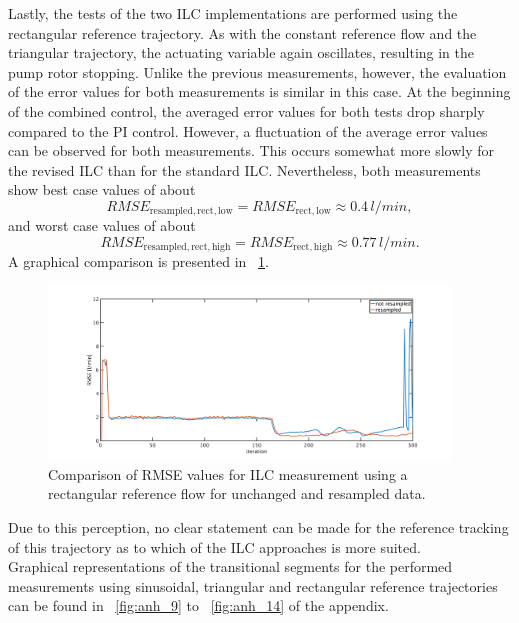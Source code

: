 Lastly, the tests of the two ILC implementations are performed using the rectangular reference trajectory.  As with the constant reference flow and the triangular trajectory, the actuating variable again oscillates, resulting in the pump rotor stopping.
Unlike the previous measurements, however, the evaluation of the error values for both measurements is similar in this case. At the beginning of the combined control, the averaged error values for both tests drop sharply compared to the PI control. However, a fluctuation of the average error values can be observed for both measurements. This occurs somewhat more slowly for the revised ILC than for the standard ILC. Nevertheless, both measurements show best case values of about
\begin{equation}
  RMSE_{\mathrm{resampled,rect,low}}=RMSE_{\mathrm{rect,low}}\approx0.4\,l/min,
\end{equation}
and worst case values of about
\begin{equation}
  RMSE_{\mathrm{resampled,rect,high}}=RMSE_{\mathrm{rect,high}}\approx0.77\,l/min.
\end{equation}
A graphical comparison is presented in \figurename~\ref{fig:RMSE_ilc_var_dist_comp_rect}.
\begin{figure}[ht!]
  \centering
  \includegraphics[width=0.95\textwidth]{images/chapt_5/ILC/RMSE_ilc_var_dist_comp_rect.pdf}
  \caption[Comparison of RMSE values for ILC measurement using a rectangular reference flow for unchanged and resampled data]{Comparison of RMSE values for ILC measurement using a rectangular reference flow for unchanged and resampled data.}
  \label{fig:RMSE_ilc_var_dist_comp_rect}
\end{figure}
Due to this perception, no clear statement can be made for the reference tracking of this trajectory as to which of the ILC approaches is more suited.
\\Graphical representations of the transitional segments for the performed measurements using sinusoidal, triangular and rectangular reference trajectories can be found in \figurename~\ref{fig:anh_9} to \figurename~\ref{fig:anh_14} of the appendix.

